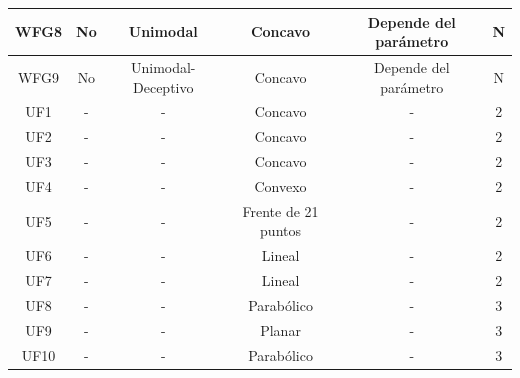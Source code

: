 \begin{table}[H]
{\begin{tabular}{|c|c|c|c|c|c|}
WFG8 & No & Unimodal & Concavo & Depende del parámetro & N \\ \hline
WFG9 & No & Unimodal-Deceptivo & Concavo & Depende del parámetro & N \\ \hline
UF1 & - & - & Concavo & - & 2 \\ \hline
UF2 & - & - & Concavo & - & 2 \\ \hline
UF3 & - & - & Concavo & - & 2 \\ \hline
UF4 & - & - & Convexo & - & 2 \\ \hline
UF5 & - & - & Frente de 21 puntos & - & 2 \\ \hline
UF6 & - & - & Lineal & - & 2 \\ \hline
UF7 & - & - & Lineal & - & 2 \\ \hline
UF8 & - & - & Parabólico & - & 3 \\ \hline
UF9 & - & - & Planar & - & 3 \\ \hline
UF10 & - & - & Parabólico & - & 3 \\ \hline
\end{tabular}%
}
\end{table}

